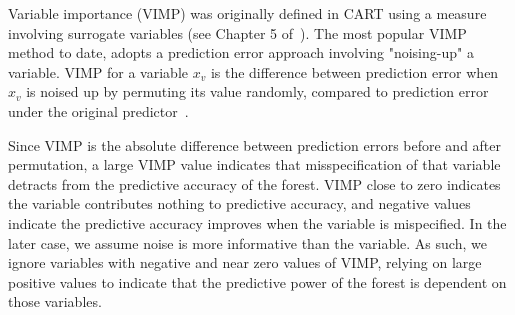 \documentclass[nojss]{jss}
\begin{document}
Variable importance (VIMP) was originally defined in CART using a measure involving surrogate variables (see Chapter 5 of~\cite{cart:1984}). The most popular VIMP method to date, adopts a prediction error approach involving "noising-up" a variable. VIMP for a variable $x_v$ is the difference between prediction error when $x_v$ is noised up by permuting its value randomly, compared to prediction error under the original predictor~\citep{Breiman:2001,liaw:2002,Ishwaran:2007,Ishwaran:2008}.

Since VIMP is the absolute difference between prediction errors before and after permutation, a large VIMP value indicates that misspecification of that variable detracts from the predictive accuracy of the forest. VIMP close to zero indicates the variable contributes nothing to predictive accuracy, and negative values indicate the predictive accuracy improves when the variable is mispecified. In the later case, we assume noise is more informative than the variable. As such, we ignore variables with negative and near zero values of VIMP, relying on large positive values to indicate that the predictive power of the forest is dependent on those variables. 
\end{document}
